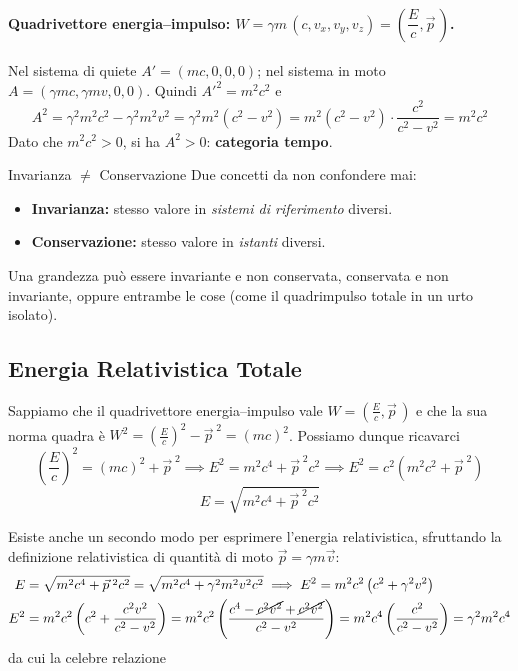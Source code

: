 \paragraph{Quadrivettore energia--impulso: $W = \gamma m\,(c, v_x, v_y, v_z) = \left(\dfrac{E}{c}, \vec{p}\,\right)$.}
Nel sistema di quiete $A' = (mc, 0, 0, 0)$; nel sistema in moto $A = (\gamma mc, \gamma mv, 0, 0)$. Quindi $A'^2 = m^2c^2$ e
\begin{equation}
    A^2 = \gamma^2 m^2 c^2 - \gamma^2 m^2 v^2 = \gamma^2 m^2 (c^2-v^2)
        = m^2 (c^2 - v^2) \cdot \frac{c^2}{c^2-v^2} = m^2 c^2
\end{equation}
Dato che $m^2c^2 > 0$, si ha $A^2 > 0$: \textbf{categoria tempo}.

\begin{attenzione}{Invarianza $\neq$ Conservazione}
Due concetti da non confondere mai:
\begin{itemize}[leftmargin=1.4em]
    \item \textbf{Invarianza:} stesso valore in \emph{sistemi di riferimento} diversi.
    \item \textbf{Conservazione:} stesso valore in \emph{istanti} diversi.
\end{itemize}
Una grandezza può essere invariante e non conservata, conservata e non invariante, oppure entrambe le cose (come il quadrimpulso totale in un urto isolato).
\end{attenzione}

\subsection{Energia Relativistica Totale}

Sappiamo che il quadrivettore energia--impulso vale $W = \left(\frac{E}{c}, \vec{p}\,\right)$ e che la sua norma quadra è $W^2 = \left(\frac{E}{c}\right)^2 - \vec{p}^{\;2} = (mc)^2$. Possiamo dunque ricavarci
\begin{equation*}
    \left(\frac{E}{c}\right)^{\!2} = (mc)^2 + \vec{p}^{\;2}
    \implies E^2 = m^2c^4 + \vec{p}^{\;2}c^2
    \implies E^2 = c^2\left(m^2c^2 + \vec{p}^{\;2}\right)
\end{equation*}
\begin{equation}
    \boxed{\;E = \sqrt{m^2c^4 + \vec{p}^{\;2}c^2}\;}
\end{equation}

Esiste anche un secondo modo per esprimere l'energia relativistica, sfruttando la definizione relativistica di quantità di moto $\vec{p} = \gamma m \vec{v}$:
\begin{align*}
    E &= \sqrt{m^2c^4 + \vec{p}^{\;2}c^2} = \sqrt{m^2c^4 + \gamma^2 m^2 v^2 c^2}
    \implies E^2 = m^2c^2\left(c^2 + \gamma^2 v^2\right) \\
    E^2 &= m^2c^2\left(c^2 + \frac{c^2v^2}{c^2-v^2}\right)
       = m^2c^2\left(\frac{c^4 - \cancel{c^2v^2} + \cancel{c^2v^2}}{c^2-v^2}\right)
       = m^2c^4\left(\frac{c^2}{c^2-v^2}\right) = \gamma^2 m^2 c^4
\end{align*}
da cui la celebre relazione

